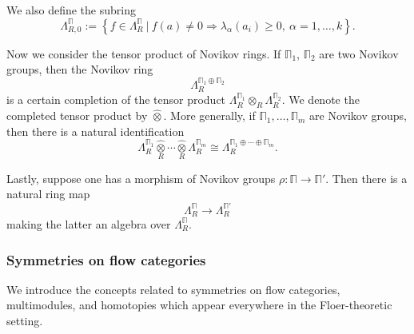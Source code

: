 \documentclass[reqno, 10pt]{amsart}
\numberwithin{equation}{section}
\numberwithin{equation}{section}
\theoremstyle{definition}
\theoremstyle{remark}
\newcommand{\beqn}{\begin{equation*}}
\newcommand{\eeqn}{\end{equation*}}
\newcommand{\mb}{\mathbb}
\begin{document}
We also define the subring
\beqn
\Lambda_{R,0}^{\mb\Pi}:= \left\{ f \in \Lambda_R^{\mb\Pi}\ |\ f(a) \neq 0 \Longrightarrow \lambda_\alpha (a_i) \geq 0,\ \alpha = 1, \ldots, k \right\}.
\eeqn

Now we consider the tensor product of Novikov rings. If $\mb\Pi_1$, $\mb\Pi_2$ are two Novikov groups, then the Novikov ring 
\beqn
\Lambda_R^{\mb\Pi_1 \oplus \mb\Pi_2}
\eeqn
is a certain completion of the tensor product $\Lambda_R^{\mb\Pi_1} \otimes_R \Lambda_R^{\mb\Pi_2}$. We denote the completed tensor product by $\widehat\otimes$. More generally, if $\mb\Pi_1, \ldots, \mb\Pi_m$ are Novikov groups, then there is a natural identification
\beqn
\Lambda^{\mb\Pi_1}_R \widehat{ \underset{R}{\otimes} } \cdots \widehat{ \underset{R}{\otimes} } \Lambda^{\mb\Pi_m}_R \cong \Lambda_R^{\mb\Pi_1 \oplus \cdots \oplus \mb\Pi_m}.
\eeqn


Lastly, suppose one has a morphism of Novikov groups $\rho: \mb\Pi \to \mb\Pi'$.  Then there is a natural ring map
\beqn
\Lambda_R^{\mb\Pi} \to \Lambda_R^{\mb\Pi'}
\eeqn
making the latter an algebra over $\Lambda_R^{\mb\Pi}$.


\subsubsection{Symmetries on flow categories}





We introduce the concepts related to symmetries on flow categories, multimodules, and homotopies which appear everywhere in the Floer-theoretic setting.
\end{document}
